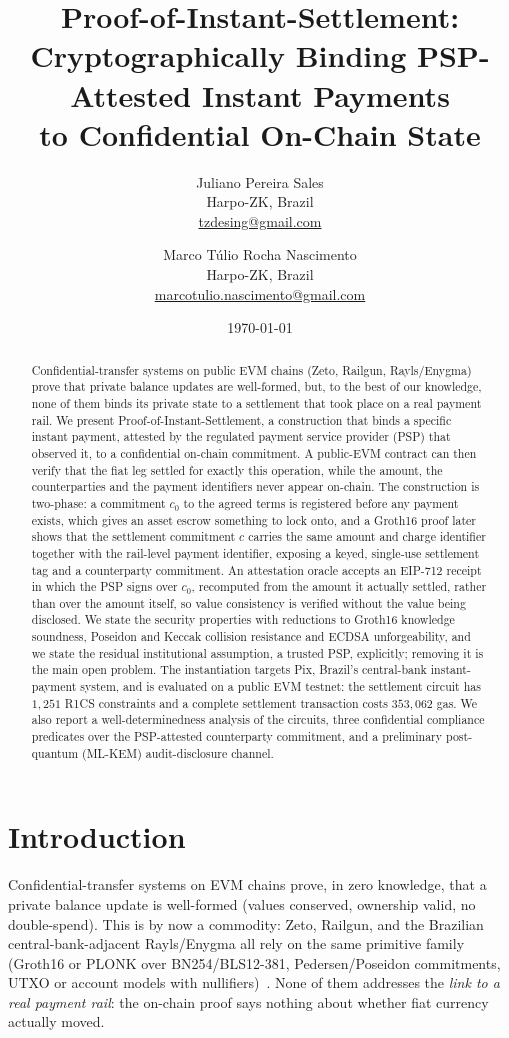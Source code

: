 \documentclass[11pt]{article}
\title{\textbf{Proof-of-Instant-Settlement:}\\
Cryptographically Binding PSP-Attested Instant Payments\\
to Confidential On-Chain State}
\author{%
  \begin{tabular}[t]{c}
  Juliano Pereira Sales \\
  \small Harpo-ZK, Brazil \\
  \small \href{mailto:tzdesing@gmail.com}{tzdesing@gmail.com}
  \end{tabular}
  \and
  \begin{tabular}[t]{c}
  Marco T\'ulio Rocha Nascimento \\
  \small Harpo-ZK, Brazil \\
  \small \href{mailto:marcotulio.nascimento@gmail.com}{marcotulio.nascimento@gmail.com}
  \end{tabular}
}
\date{\today}
\begin{document}
\maketitle

\begin{abstract}
Confidential-transfer systems on public EVM chains (Zeto, Railgun,
Rayls/Enygma) prove that private balance updates are well-formed, but, to the
best of our knowledge, none of them binds its private state to a settlement
that took place on a real payment rail. We present Proof-of-Instant-Settlement,
a construction that binds a specific instant payment, attested by the
regulated payment service provider (PSP) that observed it, to a confidential
on-chain commitment. A public-EVM contract can then verify that the fiat leg
settled for exactly this operation, while the amount, the counterparties and
the payment identifiers never appear on-chain. The construction is two-phase:
a commitment $c_0$ to the agreed terms is registered before any payment
exists, which gives an asset escrow something to lock onto, and a Groth16
proof later shows that the settlement commitment $c$ carries the same amount
and charge identifier together with the rail-level payment identifier,
exposing a keyed, single-use settlement tag and a counterparty commitment. An
attestation oracle accepts an EIP-712 receipt in which the PSP signs over
$c_0$, recomputed from the amount it actually settled, rather than over the
amount itself, so value consistency is verified without the value being
disclosed. We state the security properties with reductions to Groth16
knowledge soundness, Poseidon and Keccak collision resistance and ECDSA
unforgeability, and we state the residual institutional assumption, a trusted
PSP, explicitly; removing it is the main open problem. The instantiation
targets Pix, Brazil's central-bank instant-payment system, and is evaluated on
a public EVM testnet: the settlement circuit has $1{,}251$ R1CS constraints and
a complete settlement transaction costs $353{,}062$ gas. We also report a
well-determinedness analysis of the circuits, three confidential compliance
predicates over the PSP-attested counterparty commitment, and a preliminary
post-quantum (ML-KEM) audit-disclosure channel.
\end{abstract}

\section{Introduction}

Confidential-transfer systems on EVM chains prove, in zero knowledge, that a
private balance update is well-formed (values conserved, ownership valid, no
double-spend). This is by now a commodity: Zeto, Railgun, and the Brazilian
central-bank-adjacent Rayls/Enygma all rely on the same primitive family
(Groth16 or PLONK over BN254/BLS12-381, Pedersen/Poseidon commitments, UTXO or
account models with nullifiers)~\cite{rayls,zeto}. None of them addresses the
\emph{link to a real payment rail}: the on-chain proof says nothing about
whether fiat currency actually moved.
\end{document}
